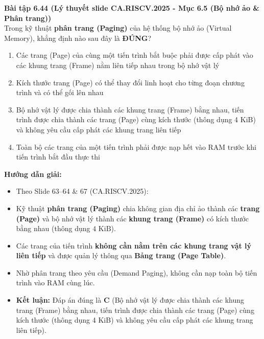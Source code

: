 \textbf{Bài tập 6.44 (Lý thuyết slide CA.RISCV.2025 - Mục 6.5 (Bộ nhớ ảo \& Phân trang))}\\
Trong kỹ thuật \textbf{phân trang (Paging)} của hệ thống bộ nhớ ảo (Virtual Memory), khẳng định nào sau đây là \textbf{ĐÚNG}?
\begin{enumerate}[label=\Alph*.]
    \item Các trang (Page) của cùng một tiến trình bắt buộc phải được cấp phát vào các khung trang (Frame) nằm liên tiếp nhau trong bộ nhớ vật lý
    \item Kích thước trang (Page) có thể thay đổi linh hoạt cho từng đoạn chương trình và có thể gối lên nhau
    \item Bộ nhớ vật lý được chia thành các khung trang (Frame) bằng nhau, tiến trình được chia thành các trang (Page) cùng kích thước (thông dụng 4 KiB) và không yêu cầu cấp phát các khung trang liên tiếp
    \item Toàn bộ các trang của một tiến trình phải được nạp hết vào RAM trước khi tiến trình bắt đầu thực thi
\end{enumerate}
\textbf{Hướng dẫn giải:}
\begin{itemize}
    \item Theo Slide 63--64 \& 67 (CA.RISCV.2025):
    \item Kỹ thuật \textbf{phân trang (Paging)} chia không gian địa chỉ ảo thành các \textbf{trang (Page)} và bộ nhớ vật lý thành các \textbf{khung trang (Frame)} có kích thước bằng nhau (thông dụng $4\text{ KiB}$).
    \item Các trang của tiến trình \textbf{không cần nằm trên các khung trang vật lý liên tiếp} và được quản lý thông qua \textbf{Bảng trang (Page Table)}.
    \item Nhờ phân trang theo yêu cầu (Demand Paging), không cần nạp toàn bộ tiến trình vào RAM cùng lúc.
    \item \textbf{Kết luận:} Đáp án đúng là \textbf{C} (Bộ nhớ vật lý được chia thành các khung trang (Frame) bằng nhau, tiến trình được chia thành các trang (Page) cùng kích thước (thông dụng 4 KiB) và không yêu cầu cấp phát các khung trang liên tiếp).
\end{itemize}

